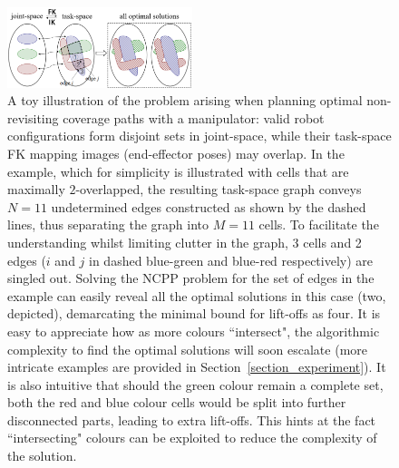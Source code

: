 \documentclass[conference]{IEEEtran}
\begin{document}
\begin{figure}[t]
\centering
\includegraphics[width = 0.48\textwidth]{figures/mapping_2}
\caption{A toy illustration of the problem arising when planning optimal non-revisiting coverage paths with a manipulator: valid robot configurations form disjoint sets in joint-space, while their task-space FK mapping images (end-effector poses) may overlap. 
In the example, which for simplicity is illustrated with cells that are maximally $2$-overlapped, the resulting task-space graph 
conveys $N = 11$ undetermined edges constructed as shown by the dashed lines, thus separating the graph into $M = 11$ cells.
To facilitate the understanding whilst limiting clutter in the graph, 3 cells and 2 edges ($i$ and $j$ in dashed blue-green and blue-red respectively) are singled out.
Solving the NCPP problem for the set of edges in the example can easily reveal all the optimal solutions in this case (two, depicted), demarcating the minimal bound for lift-offs as four. 
It is easy to appreciate how as more colours ``intersect", the algorithmic complexity to find the optimal solutions will soon escalate (more intricate examples are provided in Section~\ref{section_experiment}). 
It is also intuitive that should the green colour remain a complete set, both the red and blue colour cells would be split into further disconnected parts, leading to extra lift-offs. %
This hints at the fact ``intersecting" colours %
can be exploited to reduce the complexity of the solution.
}
\label{fig:mapping}
\end{figure}
\end{document}
